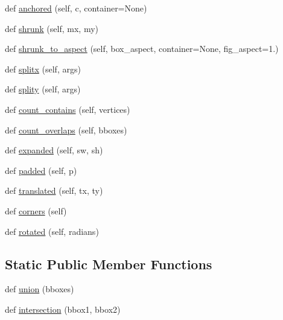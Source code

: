 \begin{DoxyCompactItemize}
\item 
def \hyperlink{classmatplotlib_1_1transforms_1_1BboxBase_af21b95e17ee0b5919defb690684ade2d}{anchored} (self, c, container=None)
\item 
def \hyperlink{classmatplotlib_1_1transforms_1_1BboxBase_ac58f91fa89823abe30d1c8ea972a18fe}{shrunk} (self, mx, my)
\item 
def \hyperlink{classmatplotlib_1_1transforms_1_1BboxBase_aacaf20b9c121d0e05fa1b26fc6ab91a2}{shrunk\+\_\+to\+\_\+aspect} (self, box\+\_\+aspect, container=None, fig\+\_\+aspect=1.)
\item 
def \hyperlink{classmatplotlib_1_1transforms_1_1BboxBase_a1ed34decfc9b1907eb70fa58238c92d1}{splitx} (self, args)
\item 
def \hyperlink{classmatplotlib_1_1transforms_1_1BboxBase_a62c520887c5aa295c1be4c6773bfe84a}{splity} (self, args)
\item 
def \hyperlink{classmatplotlib_1_1transforms_1_1BboxBase_aaa8aac7e0228746fb8e124b18a4b205b}{count\+\_\+contains} (self, vertices)
\item 
def \hyperlink{classmatplotlib_1_1transforms_1_1BboxBase_ab92a4ef72794910c3364d3fbf7a7ebee}{count\+\_\+overlaps} (self, bboxes)
\item 
def \hyperlink{classmatplotlib_1_1transforms_1_1BboxBase_af70f4cac095c9a0d89482262c9e56bb3}{expanded} (self, sw, sh)
\item 
def \hyperlink{classmatplotlib_1_1transforms_1_1BboxBase_aa6e63bed78104b50ff7509b944ac5e0a}{padded} (self, p)
\item 
def \hyperlink{classmatplotlib_1_1transforms_1_1BboxBase_a23a3abbc8ef8e2d4c5a642a14631bbe1}{translated} (self, tx, ty)
\item 
def \hyperlink{classmatplotlib_1_1transforms_1_1BboxBase_ab9a4fca6d0dbc3d413409b9fad0bef50}{corners} (self)
\item 
def \hyperlink{classmatplotlib_1_1transforms_1_1BboxBase_a31786df343c2ef286149c861c4062dea}{rotated} (self, radians)
\end{DoxyCompactItemize}
\subsection*{Static Public Member Functions}
\begin{DoxyCompactItemize}
\item 
def \hyperlink{classmatplotlib_1_1transforms_1_1BboxBase_a73e26e07f58806d5270a2b06c6a2bb9f}{union} (bboxes)
\item 
def \hyperlink{classmatplotlib_1_1transforms_1_1BboxBase_aec84199e6d97d7d098dae0ee1a6a7466}{intersection} (bbox1, bbox2)
\end{DoxyCompactItemize}
